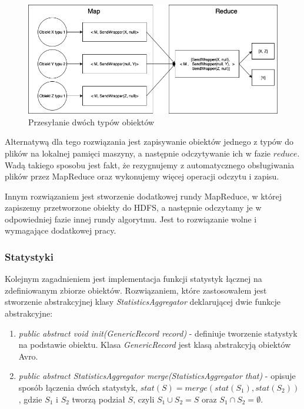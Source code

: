 \documentclass[magisterska]{pracamgr}
\begin{document}
\begin{figure}[H]
    \caption{Przesyłanie dwóch typów obiektów}
    \includegraphics[width=15cm]{sending_multiple_typles.png}
\end{figure}

Alternatywą dla tego rozwiązania jest zapisywanie obiektów jednego z typów do plików na lokalnej pamięci maszyny, a następnie odczytywanie ich w fazie \(reduce\). Wadą takiego sposobu jest fakt, że rezygnujemy z automatycznego obsługiwania plików przez MapReduce oraz wykonujemy więcej operacji odczytu i zapisu.

Innym rozwiązaniem jest stworzenie dodatkowej rundy MapReduce, w której zapiszemy przetworzone obiekty do HDFS, a następnie odczytamy je w odpowiedniej fazie innej rundy algorytmu. Jest to rozwiązanie wolne i wymagające dodatkowej pracy.

\subsubsection{Statystyki} \label{hadoop_statystyki}

Kolejnym zagadnieniem jest implementacja funkcji statystyk łącznej na zdefiniowanym zbiorze obiektów. Rozwiązaniem, które zastosowałem jest stworzenie abstrakcyjnej klasy \mbox{\textit{StatisticsAggregator}} deklarującej dwie funkcje abstrakcyjne:
\begin{enumerate}
    \item \textit{public abstract void init(GenericRecord record)} - definiuje tworzenie statystyk na podstawie obiektu. Klasa \textit{GenericRecord} jest klasą abstrakcyją obiektów Avro.
    \item \textit{public abstract StatisticsAggregator merge(StatisticsAggregator that)} - opisuje sposób łączenia dwóch statystyk, \(stat(S) = merge(stat(S_1), stat(S_2))\), gdzie \(S_1\) i \(S_2\) tworzą podział \(S\), czyli \(S_1 \cup S_2 = S\) oraz \(S_1 \cap S_2 = \emptyset\).
\end{enumerate}
\end{document}
